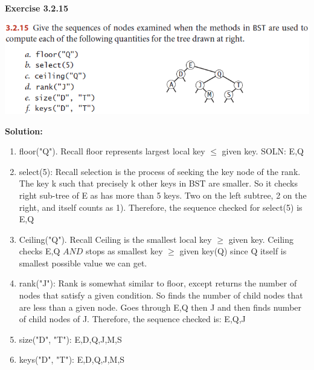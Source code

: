 \documentclass[11pt,fleqn]{article}
\newcommand{\be}{\begin{enumerate}}
\newcommand{\ee}{\end{enumerate}}
\begin{document}
\textbf{Exercise 3.2.15}
\begin{center}
	\includegraphics[scale=1]{3.2.15.png}
\end{center}

\textbf{Solution:}
\be
	\item floor("Q"). Recall floor represents largest local key $\le$ given key. SOLN: E,Q
	
	\item select(5): Recall selection is the process of seeking the key node of the rank. The key k such that precisely k other keys in BST are smaller. So it checks right sub-tree of E as has more than 5 keys. Two on the left subtree, 2 on the right, and itself counts as 1). Therefore, the sequence checked for select(5) is E,Q
	
	\item Ceiling("Q"). Recall Ceiling is the smallest local key $\ge$ given key. Ceiling checks E,Q $AND$ stops as smallest key $\ge$ given key(Q) since Q itself is smallest possible value we can get.
	
	\item rank("J"): Rank is somewhat similar to floor, except returns the number of nodes that satisfy a given condition. So finds the number of child nodes that are less than a given node. Goes through E,Q then J and then finds number of child nodes of J.  Therefore, the sequence checked is: E,Q,J
	
	\item size("D", "T"): E,D,Q,J,M,S
	\item keys("D", "T"): E,D,Q,J,M,S
\ee
\end{document}
